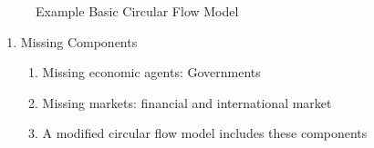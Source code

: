 \documentclass[12pt]{article}
\begin{document}
\begin{enumerate}
\begin{enumerate}
\begin{enumerate}
            \end{enumerate}

            \begin{center}
              \begin{figure}[h]
                \centering
                
                \caption{Example Basic Circular Flow Model}
                \label{fig:1}
              \end{figure}
            \end{center}

            \begin{enumerate}

              \item Missing Components

                \begin{enumerate}

                  \item Missing economic agents: Governments

                  \item Missing markets: financial and international market

                  \item A modified circular flow model includes these components

                \end{enumerate}

            \end{enumerate}

        \end{enumerate}

    \end{enumerate}
\end{document}
